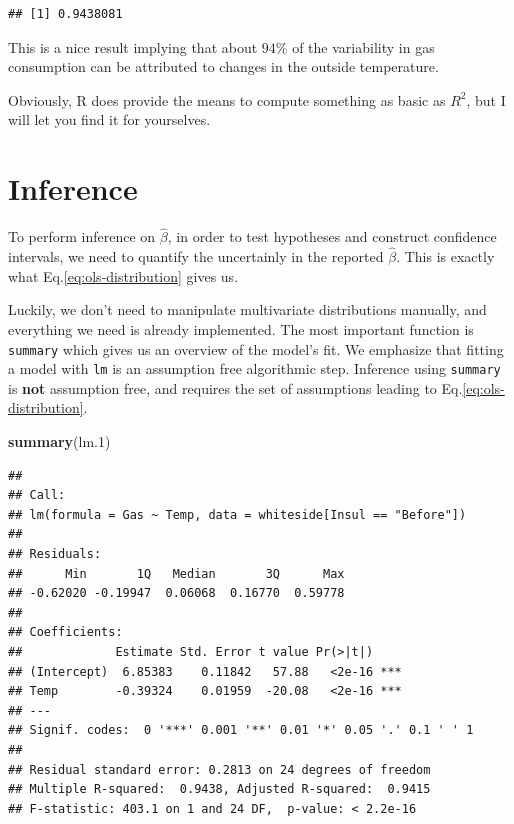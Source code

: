 \documentclass[]{book}
\newenvironment{Shaded}{\begin{snugshade}}{\end{snugshade}}
\newcommand{\KeywordTok}[1]{\textcolor[rgb]{0.13,0.29,0.53}{\textbf{#1}}}
\newcommand{\DecValTok}[1]{\textcolor[rgb]{0.00,0.00,0.81}{#1}}
\newcommand{\NormalTok}[1]{#1}
\theoremstyle{definition}
\theoremstyle{definition}
\theoremstyle{definition}
\theoremstyle{remark}
\begin{document}
\begin{verbatim}
## [1] 0.9438081
\end{verbatim}

This is a nice result implying that about \(94\%\) of the variability in
gas consumption can be attributed to changes in the outside temperature.

Obviously, R does provide the means to compute something as basic as
\(R^2\), but I will let you find it for yourselves.

\section{Inference}\label{inference}

To perform inference on \(\hat \beta\), in order to test hypotheses and
construct confidence intervals, we need to quantify the uncertainly in
the reported \(\hat \beta\). This is exactly what
Eq.\eqref{eq:ols-distribution} gives us.

Luckily, we don't need to manipulate multivariate distributions
manually, and everything we need is already implemented. The most
important function is \texttt{summary} which gives us an overview of the
model's fit. We emphasize that fitting a model with \texttt{lm} is an
assumption free algorithmic step. Inference using \texttt{summary} is
\textbf{not} assumption free, and requires the set of assumptions
leading to Eq.\eqref{eq:ols-distribution}.

\begin{Shaded}
\begin{Highlighting}[]
\KeywordTok{summary}\NormalTok{(lm.}\DecValTok{1}\NormalTok{)}
\end{Highlighting}
\end{Shaded}

\begin{verbatim}
## 
## Call:
## lm(formula = Gas ~ Temp, data = whiteside[Insul == "Before"])
## 
## Residuals:
##      Min       1Q   Median       3Q      Max 
## -0.62020 -0.19947  0.06068  0.16770  0.59778 
## 
## Coefficients:
##             Estimate Std. Error t value Pr(>|t|)    
## (Intercept)  6.85383    0.11842   57.88   <2e-16 ***
## Temp        -0.39324    0.01959  -20.08   <2e-16 ***
## ---
## Signif. codes:  0 '***' 0.001 '**' 0.01 '*' 0.05 '.' 0.1 ' ' 1
## 
## Residual standard error: 0.2813 on 24 degrees of freedom
## Multiple R-squared:  0.9438, Adjusted R-squared:  0.9415 
## F-statistic: 403.1 on 1 and 24 DF,  p-value: < 2.2e-16
\end{verbatim}
\end{document}
